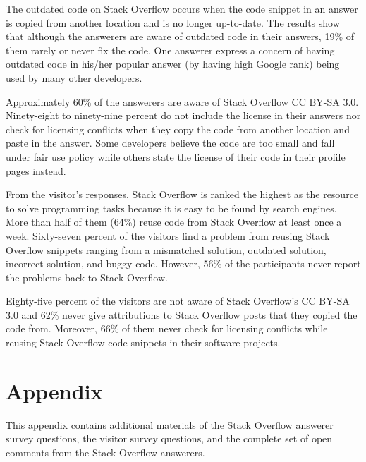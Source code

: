 \documentclass{svjour3}                     %
\begin{document}
The outdated code on Stack Overflow occurs when the code snippet in an answer is
copied from another location and is no longer up-to-date. The results show that
although the answerers are aware of outdated code in their answers, 19\% of them
rarely or never fix the code. One answerer express a concern of having
outdated code in his/her popular answer (by having high Google rank) being used 
by many other developers.

Approximately 60\% of the answerers are aware of
Stack Overflow CC BY-SA 3.0. Ninety-eight to ninety-nine percent do not include
the license in their answers nor check for licensing conflicts when they copy
the code from another location and paste in the answer. Some developers believe
the code are too small and fall under fair use policy while others state the license
of their code in their profile pages instead.

From the visitor's responses, Stack Overflow is ranked the highest as the
resource to solve programming tasks because it is easy to be found by search
engines. More than half of them (64\%) reuse code from Stack Overflow at least
once a week. Sixty-seven percent of the visitors find a problem from reusing
Stack Overflow snippets ranging from a mismatched solution, outdated solution,
incorrect solution, and buggy code. However, 56\% of the participants never
report the problems back to Stack Overflow.

Eighty-five percent of the visitors are not aware of Stack Overflow's CC BY-SA
3.0 and 62\% never give attributions to Stack Overflow posts that they copied
the code from. Moreover, 66\% of them never check for licensing conflicts while
reusing Stack Overflow code snippets in their software projects.


%
%

 

\clearpage
\section{Appendix}

This appendix contains additional materials of the Stack Overflow answerer survey questions, the visitor survey questions, and the complete set of open comments from the Stack Overflow answerers.

\clearpage

\appendix
\end{document}
